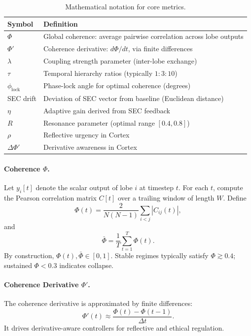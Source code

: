 \documentclass[11pt,a4paper]{article}
\begin{document}
\begin{table}[h]
\centering
\begin{tabular}{ll}
\toprule
Symbol & Definition \\
\midrule
\( \Phi \)      & Global coherence: average pairwise correlation across lobe outputs \\
\( \Phi' \)     & Coherence derivative: \( d\Phi/dt \), via finite differences \\
\( \lambda \)   & Coupling strength parameter (inter-lobe exchange) \\
\( \tau \)      & Temporal hierarchy ratios (typically \(1:3:10\)) \\
\( \phi_{\text{lock}} \) & Phase-lock angle for optimal coherence (degrees) \\
SEC drift       & Deviation of SEC vector from baseline (Euclidean distance) \\
\( \eta \)      & Adaptive gain derived from SEC feedback \\
\( R \)         & Resonance parameter (optimal range \([0.4, 0.8]\)) \\
\( \rho \)      & Reflective urgency in Cortex \\
\( \Delta\Phi' \)& Derivative awareness in Cortex \\
\bottomrule
\end{tabular}
\caption{Mathematical notation for core metrics.}
\label{tab:notation}
\end{table}

\paragraph{Coherence \( \Phi \).}
Let \( y_i[t] \) denote the scalar output of lobe \( i \) at timestep \( t \). For each \( t \), compute the Pearson correlation matrix \( C[t] \) over a trailing window of length \( W \). Define
\[
\Phi(t) = \frac{2}{N(N-1)} \sum_{i<j} |C_{ij}(t)|,
\]
and
\[
\bar{\Phi} = \frac{1}{T} \sum_{t=1}^{T} \Phi(t).
\]
By construction, \( \Phi(t), \bar{\Phi} \in [0,1] \). Stable regimes typically satisfy \( \Phi \gtrsim 0.4 \); sustained \( \Phi < 0.3 \) indicates collapse.

\paragraph{Coherence Derivative \( \Phi' \).}
The coherence derivative is approximated by finite differences:
\[
\Phi'(t) \approx \frac{\Phi(t) - \Phi(t-1)}{\Delta t}.
\]
It drives derivative-aware controllers for reflective and ethical regulation.
\end{document}
